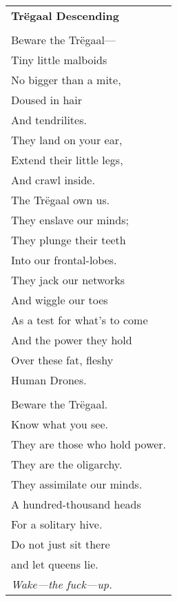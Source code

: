 \documentclass{article}
\begin{document}
\begin{center}
\begin{tabular}{l}
\textbf{Tr{\"e}gaal Descending} \\
\\
Beware the Tr{\"e}gaal--- \\
Tiny little malboids \\
No bigger than a mite, \\
Doused in hair \\
And tendrilites. \\
They land on your ear, \\
Extend their little legs, \\
And crawl inside. \\
The Tr{\"e}gaal own us. \\
They enslave our minds; \\
They plunge their teeth \\
Into our frontal-lobes. \\
They jack our networks \\
And wiggle our toes \\
As a test for what's to come \\
And the power they hold \\
Over these fat, fleshy \\
Human Drones. \\
\\
Beware the Tr{\"e}gaal. \\
Know what you see. \\
They are those who hold power. \\
They are the oligarchy. \\
They assimilate our minds. \\
A hundred-thousand heads \\
For a solitary hive. \\
Do not just sit there \\
and let queens lie. \\
\textit{Wake---the fuck---up.} \\
\end{tabular}
\end{center}
\end{document}
